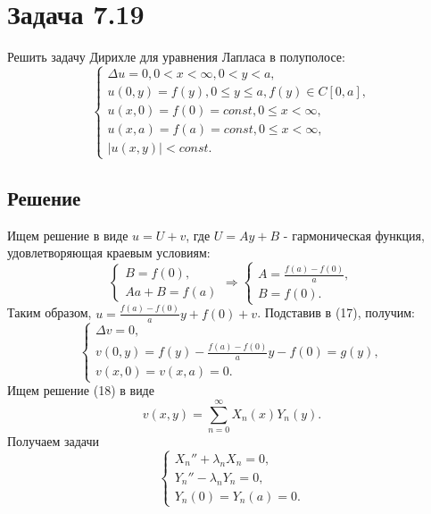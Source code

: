\documentclass[11pt]{article}
\begin{document}
\section{Задача 7.19}
\label{sec:org6d919a7}
Решить задачу Дирихле для уравнения Лапласа в полуполосе:
\begin{equation}
\begin{cases}
\Delta u = 0, 0 < x < \infty, 0 < y < a, \\
u(0, y) = f(y), 0 \leq y \leq a, f(y) \in C[0, a], \\
u(x, 0) = f(0) = const, 0 \leq x < \infty, \\
u(x, a) = f(a) = const, 0 \leq x < \infty, \\
|u(x, y)| < const.
\end{cases}
\end{equation}
\subsection{Решение}
\label{sec:org22f3121}
Ищем решение в виде $u = U + v$, где $U = Ay + B$ - гармоническая функция, удовлетворяющая
краевым условиям:
\begin{equation*}
\begin{cases}
B = f(0), \\
Aa + B = f(a)
\end{cases}
\Rightarrow
\begin{cases}
A = \frac{f(a) - f(0)}a, \\
B = f(0).
\end{cases}
\end{equation*}
Таким образом, $u = \frac{f(a) - f(0)}ay + f(0) + v$. Подставив в (17), получим:
\begin{equation}
\begin{cases}
\Delta v = 0, \\
v(0, y) = f(y) - \frac{f(a) - f(0)}ay - f(0) = g(y), \\
v(x, 0) = v(x, a) = 0.
\end{cases}
\end{equation}
Ищем решение (18) в виде
\begin{equation*}
v(x, y) = \sum_{n = 0}^{\infty}X_n(x)Y_n(y).
\end{equation*}
Получаем задачи
\begin{equation*}
\begin{cases}
X_n'' + \lambda_n X_n = 0, \\
Y_n'' - \lambda_n Y_n  = 0, \\
Y_n(0) = Y_n(a) = 0.
\end{cases}
\end{equation*}
\end{document}
